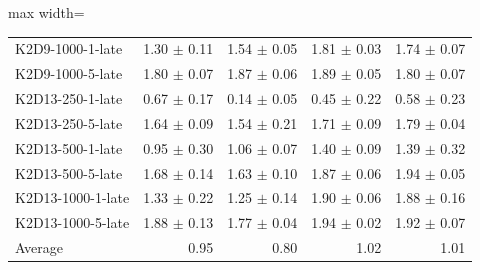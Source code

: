 \documentclass{article}
\begin{document}
\begin{table}[ht]
\begin{center}
\begin{small}
\begin{adjustbox}{max width=\columnwidth}
\begin{tabular}{l|rrrr}
K2D9-1000-1-late & 1.30 $\pm$ 0.11 & 1.54 $\pm$ 0.05 & 1.81 $\pm$ 0.03 & 1.74 $\pm$ 0.07\\
K2D9-1000-5-late & 1.80 $\pm$ 0.07 & 1.87 $\pm$ 0.06 & 1.89 $\pm$ 0.05 & 1.80 $\pm$ 0.07\\
K2D13-250-1-late & 0.67 $\pm$ 0.17 & 0.14 $\pm$ 0.05 & 0.45 $\pm$ 0.22 & 0.58 $\pm$ 0.23\\
K2D13-250-5-late & 1.64 $\pm$ 0.09 & 1.54 $\pm$ 0.21 & 1.71 $\pm$ 0.09 & 1.79 $\pm$ 0.04\\
K2D13-500-1-late & 0.95 $\pm$ 0.30 & 1.06 $\pm$ 0.07 & 1.40 $\pm$ 0.09 & 1.39 $\pm$ 0.32\\
K2D13-500-5-late & 1.68 $\pm$ 0.14 & 1.63 $\pm$ 0.10 & 1.87 $\pm$ 0.06 & 1.94 $\pm$ 0.05\\
K2D13-1000-1-late & 1.33 $\pm$ 0.22 & 1.25 $\pm$ 0.14 & 1.90 $\pm$ 0.06 & 1.88 $\pm$ 0.16\\
K2D13-1000-5-late & 1.88 $\pm$ 0.13 & 1.77 $\pm$ 0.04 & 1.94 $\pm$ 0.02 & 1.92 $\pm$ 0.07\\
\midrule
Average & 0.95 & 0.80 & 1.02 & 1.01\\
\end{tabular}
        \end{adjustbox}
    \end{small}
    \end{center}
    \vskip -0.1in
\end{table}
\end{document}
